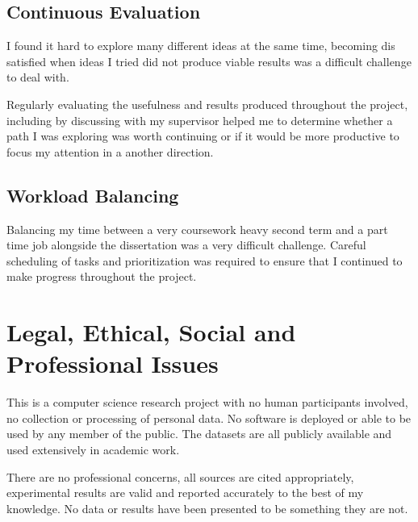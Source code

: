 \documentclass{article}
\begin{document}
\subsection{Continuous Evaluation}
I found it hard to explore many different ideas at the same time, becoming dis satisfied when ideas I tried did not produce viable results was a difficult challenge to deal with.

Regularly evaluating the usefulness and results produced throughout the project, including by discussing with my supervisor helped me to determine whether a path I was exploring was worth continuing or if it would be more productive to focus my attention in a another direction.

\subsection{Workload Balancing}
Balancing my time between a very coursework heavy second term and a part time job alongside the dissertation was a very difficult challenge.
Careful scheduling of tasks and prioritization was required to ensure that I continued to make progress throughout the project.

\section{Legal, Ethical, Social and Professional Issues}

This is a computer science research project with no human participants involved, no collection or processing of personal data. No software is deployed or able to be used by any member of the public.
The datasets are all publicly available and used extensively in academic work.

There are no professional concerns, all sources are cited appropriately, experimental results are valid and reported accurately to the best of my knowledge. No data or results have been presented to be something they are not.
\end{document}
